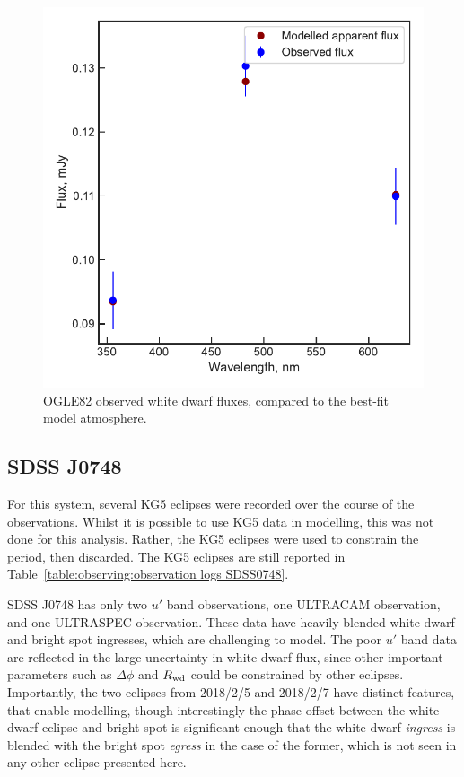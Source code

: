 \begin{figure}
    \centering
    \includegraphics[width=\textwidth]{figures/results/OGLE82/fluxplot.pdf}
    \caption{OGLE82 observed white dwarf fluxes, compared to the best-fit model atmosphere.}
    \label{fig:OGLE82 flux plot}
\end{figure}
\clearpage



\newpage
\subsection{SDSS J0748}

For this system, several KG5 eclipses were recorded over the course of the observations. Whilst it is possible to use KG5 data in modelling, this was not done for this analysis. Rather, the KG5 eclipses were used to constrain the period, then discarded. The KG5 eclipses are still reported in Table~\ref{table:observing:observation logs SDSS0748}.

SDSS J0748 has only two $u'$ band observations, one ULTRACAM observation, and one ULTRASPEC observation. These data have heavily blended white dwarf and bright spot ingresses, which are challenging to model.
The poor $u'$ band data are reflected in the large uncertainty in white dwarf flux, since other important parameters such as $\Delta\phi$ and $R_{\rm wd}$ could be constrained by other eclipses. Importantly, the two eclipses from 2018/2/5 and 2018/2/7 have distinct features, that enable modelling, though interestingly the phase offset between the white dwarf eclipse and bright spot is significant enough that the white dwarf \textit{ingress} is blended with the bright spot \textit{egress} in the case of the former, which is not seen in any other eclipse presented here.


